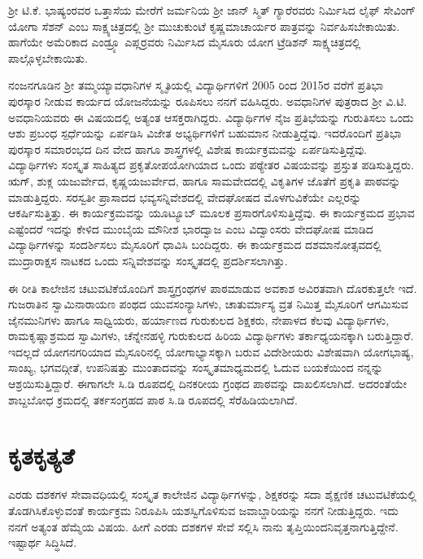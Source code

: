 {ಶ್ರೀ ಟಿ.ಕೆ. ಭಾಷ್ಯಂರವರ ಒತ್ತಾಸೆಯ ಮೇರೆಗೆ ಜರ್ಮನಿಯ ಶ್ರೀ ಜಾನ್ ಸ್ಮಿತ್ ಗ್ಯಾರೆರವರು ನಿರ್ಮಿಸಿದ ಲೈಫ್ ಸೇವಿಂಗ್ ಯೋಗಾ ಸೆಶನ್ ಎಂಬ ಸಾಕ್ಷ್ಯಚಿತ್ರದಲ್ಲಿ ಶ್ರೀ ಮುಚುಕುಂಟೆ ಕೃಷ್ಣಮಾಚಾರ್ಯರ ಪಾತ್ರವನ್ನು ನಿರ್ವಹಿಸಬೇಕಾಯಿತು.  ಹಾಗೆಯೇ ಅಮೆರಿಕಾದ ಎಂಡ್ರ್ಯೂ ಎಪ್ಲರ್‍ರವರು ನಿರ್ಮಿಸಿದ ಮೈಸೂರು ಯೋಗ ಟ್ರೆಡಿಶನ್  ಸಾಕ್ಷ್ಯಚಿತ್ರದಲ್ಲಿ ಪಾಲ್ಗೊಳ್ಳಬೇಕಾಯಿತು. 

ನಂಜನಗೂಡಿನ ಶ್ರೀ ತಮ್ಮಯ್ಯಾವಧಾನಿಗಳ ಸ್ಮೃತಿಯಲ್ಲಿ ವಿದ್ಯಾರ್ಥಿಗಳಿಗೆ 2005 ರಿಂದ 2015ರ ವರೆಗೆ ಪ್ರತಿಭಾ ಪುರಸ್ಕಾರ ನೀಡುವ ಕಾರ್ಯದ ಯೋಜನೆಯನ್ನು ರೂಪಿಸಲು ನನಗೆ ವಹಿಸಿದ್ದರು.  ಅವಧಾನಿಗಳ ಪುತ್ರರಾದ ಶ್ರೀ ವಿ.ಟಿ. ಅವಧಾನಿಯವರು ಈ ವಿಷಯದಲ್ಲಿ ಅತ್ಯಂತ ಆಸಕ್ತರಾಗಿದ್ದರು.  ವಿದ್ಯಾರ್ಥಿಗಳ ನೈಜ ಪ್ರತಿಭೆಯನ್ನು ಗುರುತಿಸಲು ಒಂದು ಆಶು ಪ್ರಬಂಧ ಸ್ಪರ್ಧೆಯನ್ನು ಏರ್ಪಡಿಸಿ ವಿಜೇತ ಅಭ್ಯರ್ಥಿ\-ಗಳಿಗೆ ಬಹುಮಾನ ನೀಡುತ್ತಿದ್ದೆವು.  ಇದರೊಂದಿಗೆ ಪ್ರತಿಭಾ ಪುರಸ್ಕಾರ ಸಮಾರಂಭದ ದಿನ ವೇದ ಹಾಗೂ ಶಾಸ್ತ್ರಗಳಲ್ಲಿ ವಿಶೇಷ ಕಾರ್ಯಕ್ರಮವನ್ನು ಏರ್ಪಡಿಸುತ್ತಿದ್ದೆವು.  ವಿದ್ಯಾರ್ಥಿ\-ಗಳು ಸಂಸ್ಕೃತ ಸಾಹಿತ್ಯದ ಪ್ರಕೃತೋಪಯೋಗಿಯಾದ ಒಂದು ಪಠ್ಯೇತರ ವಿಷಯವನ್ನು ಪ್ರಸ್ತುತ ಪಡಿಸುತ್ತಿದ್ದರು.  ಋಗ್, ಶುಕ್ಲ ಯಜುರ್ವೇದ, ಕೃಷ್ಣಯಜುರ್ವೇದ, ಹಾಗೂ ಸಾಮವೇದದಲ್ಲಿ ವಿಕೃತಿಗಳ ಜೊತೆಗೆ ಪ್ರಕೃತಿ ಪಾಠವನ್ನು ಮಾಡುತ್ತಿದ್ದರು.  ಸರಸ್ವತೀ ಪ್ರಾಸಾದದ ಭವ್ಯಸನ್ನಿವೇಶದಲ್ಲಿ ವೇದಘೋಷದ ಮೊಳಗುವಿಕೆಯೇ ಎಲ್ಲರನ್ನು ಆಕರ್ಷಿಸುತ್ತಿತ್ತು.  ಈ ಕಾರ್ಯಕ್ರಮವನ್ನು ಯೂಟ್ಯೂಬ್ ಮೂಲಕ ಪ್ರಸಾರಗೊಳಿಸುತ್ತಿದ್ದೆವು.  ಈ ಕಾರ್ಯಕ್ರಮದ ಪ್ರಭಾವ ಎಷ್ಟೆಂದರೆ ಇದನ್ನು ಕೇಳಿದ ಮುಂಬೈಯ ಮೌನೀಶ ಭಾರದ್ವಾಜ ಎಂಬ ವಿದ್ವಾಂಸರು ವೇದಘೋಷ ಮಾಡಿದ ವಿದ್ಯಾರ್ಥಿಗಳನ್ನು ಸಂದರ್ಶಿಸಲು ಮೈಸೂರಿಗೆ ಧಾವಿಸಿ ಬಂದಿದ್ದರು.  ಈ ಕಾರ್ಯಕ್ರಮದ ದಶಮಾನೋತ್ಸವದಲ್ಲಿ  ಮುದ್ರಾರಾಕ್ಷಸ ನಾಟಕದ ಒಂದು ಸನ್ನಿವೇಶವನ್ನು ಸಂಸ್ಕೃತದಲ್ಲಿ ಪ್ರದರ್ಶಿಸಲಾಗಿತ್ತು. 

ಈ ರೀತಿ ಕಾಲೇಜಿನ ಚಟುವಟಿಕೆಯೊಂದಿಗೆ ಶಾಸ್ತ್ರಗ್ರಂಥಗಳ ಪಾಠಮಾಡುವ ಅವಕಾಶ ಅವಿರತವಾಗಿ ದೊರಕುತ್ತಲೇ ಇದೆ.  ಗುಜರಾತಿನ ಸ್ವಾಮಿನಾರಾಯಣ ಪಂಥದ ಯುವಸಂನ್ಯಾಸಿಗಳು, ಚಾತುರ್ಮಾಸ್ಯ ವ್ರತ ನಿಮಿತ್ತ ಮೈಸೂರಿಗೆ ಆಗಮಿಸುವ ಜೈನಮುನಿಗಳು ಹಾಗೂ ಸಾಧ್ವಿಯರು, ಹರ್ಯಾಣದ ಗುರು\-ಕುಲದ ಶಿಕ್ಷಕರು, \hbox{ನೇಪಾಳದ} ಕೆಲವು ವಿದ್ಯಾರ್ಥಿಗಳು, ರಾಮಕೃಷ್ಣಾಶ್ರಮದ ಸ್ವಾಮಿಗಳು, ಚೆನ್ನೇನಹಳ್ಳಿ ಗುರು\-ಕುಲದ ಹಿರಿಯ ವಿದ್ಯಾರ್ಥಿಗಳು ತರ್ಕಾಧ್ಯಯನಕ್ಕಾಗಿ ಬರುತ್ತಿದ್ದಾರೆ.  ಇದಲ್ಲದೆ ಯೋಗ\-ನಗರಿ\-ಯಾದ ಮೈಸೂರಿನಲ್ಲಿ ಯೋಗಾಭ್ಯಾಸಕ್ಕಾಗಿ ಬರುವ ವಿದೇಶೀಯರು ವಿಶೇಷವಾಗಿ ಯೋಗಭಾಷ್ಯ, ಸಾಂಖ್ಯ, ಭಗವದ್ಗೀತೆ, ಉಪನಿಷತ್ತು ಮುಂತಾದವನ್ನು ಸಂಸ್ಕೃತ\-ಮಾಧ್ಯಮದಲ್ಲಿ ಓದುವ ಬಯಕೆಯಿಂದ ನನ್ನನ್ನು ಆಶ್ರಯಿಸುತ್ತಿದ್ದಾರೆ.  ಈಗಾಗಲೇ ಸಿ.ಡಿ ರೂಪದಲ್ಲಿ ದಿನಕರೀಯ ಗ್ರಂಥದ ಪಾಠವನ್ನು ದಾಖಲಿಸಲಾಗಿದೆ.  ಅದರಂತೆಯೇ ಶಾಬ್ದಬೋಧ ಕ್ರಮದಲ್ಲಿ ತರ್ಕಸಂಗ್ರಹದ ಪಾಠ ಸಿ.ಡಿ ರೂಪದಲ್ಲಿ ಸೆರೆಹಿಡಿಯ\-ಲಾಗಿದೆ.

\section*{ಕೃತಕೃತ್ಯತೆ}

ಎರಡು ದಶಕಗಳ ಸೇವಾವಧಿಯಲ್ಲಿ  ಸಂಸ್ಕೃತ ಕಾಲೇಜಿನ ವಿದ್ಯಾರ್ಥಿಗಳನ್ನು, \hbox{ಶಿಕ್ಷಕರನ್ನು} ಸದಾ ಶೈಕ್ಷಣಿಕ ಚಟುವಟಿಕೆಯಲ್ಲಿ ತೊಡಗಿಸಿಕೊಳ್ಳುವಂತೆ ಕಾರ್ಯಕ್ರಮ ನಿರೂಪಿಸಿ ಯಶಸ್ವಿಗೊಳಿಸುವ ಜವಾಬ್ದಾರಿಯನ್ನು ನನಗೆ ನೀಡುತ್ತಿದ್ದರು. ಇದು ನನಗೆ ಅತ್ಯಂತ ಹೆಮ್ಮೆಯ ವಿಷಯ. ಹೀಗೆ ಎರಡು ದಶಕಗಳ ಸೇವೆ ಸಲ್ಲಿಸಿ ನಾನು ತೃಪ್ತಿಯಿಂದ\break ನಿವೃತ್ತನಾಗುತ್ತಿದ್ದೇನೆ. ಇಷ್ಟಾರ್ಥ ಸಿದ್ಧಿಸಿದೆ.  

}
